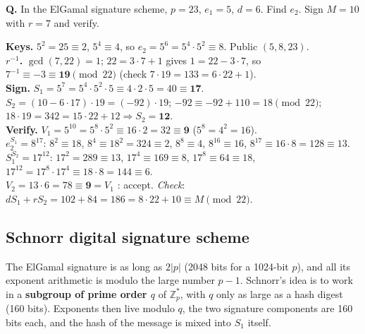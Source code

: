 \begin{worked}
\textbf{Q.} In the ElGamal signature scheme, $p = 23$, $e_1 = 5$, $d = 6$. Find $e_2$. Sign $M = 10$ with $r = 7$ and verify.

\textbf{Keys.} $5^2 = 25 \equiv 2$, $5^4 \equiv 4$, so $e_2 = 5^6 = 5^4 \cdot 5^2 \equiv 8$. Public $(5, 8, 23)$.\\
\textbf{$r^{-1}$.} $\gcd(7, 22) = 1$; $22 = 3 \cdot 7 + 1$ gives $1 = 22 - 3 \cdot 7$, so $7^{-1} \equiv -3 \equiv \mathbf{19} \pmod{22}$ (check $7 \cdot 19 = 133 = 6 \cdot 22 + 1$).\\
\textbf{Sign.} $S_1 = 5^7 = 5^4 \cdot 5^2 \cdot 5 \equiv 4 \cdot 2 \cdot 5 = 40 \equiv \mathbf{17}$.\\
$S_2 = (10 - 6 \cdot 17) \cdot 19 = (-92) \cdot 19$; $-92 \equiv -92 + 110 = 18 \pmod{22}$; $18 \cdot 19 = 342 = 15 \cdot 22 + 12 \Rightarrow S_2 = \mathbf{12}$.\\
\textbf{Verify.} $V_1 = 5^{10} = 5^8 \cdot 5^2 \equiv 16 \cdot 2 = 32 \equiv \mathbf{9}$ \;($5^8 = 4^2 = 16$).\\
$e_2^{S_1} = 8^{17}$: $8^2 \equiv 18$, $8^4 \equiv 18^2 = 324 \equiv 2$, $8^8 \equiv 4$, $8^{16} \equiv 16$, $8^{17} \equiv 16 \cdot 8 = 128 \equiv 13$.\\
$S_1^{S_2} = 17^{12}$: $17^2 = 289 \equiv 13$, $17^4 \equiv 169 \equiv 8$, $17^8 \equiv 64 \equiv 18$, $17^{12} = 17^8 \cdot 17^4 \equiv 18 \cdot 8 = 144 \equiv 6$.\\
$V_2 = 13 \cdot 6 = 78 \equiv \mathbf{9} = V_1$ \checkmark: accept. \emph{Check}: $d S_1 + r S_2 = 102 + 84 = 186 = 8 \cdot 22 + 10 \equiv M \pmod{22}$.
\end{worked}

\subsection{Schnorr digital signature scheme \new}

The ElGamal signature is as long as $2|p|$ (2048 bits for a 1024-bit $p$), and all its exponent arithmetic is modulo the large number $p - 1$. Schnorr's idea is to work in a \textbf{subgroup of prime order $q$} of $\mathbb{Z}_p^*$, with $q$ only as large as a hash digest (160 bits). Exponents then live modulo $q$, the two signature components are 160 bits each, and the hash of the message is mixed into $S_1$ itself.

